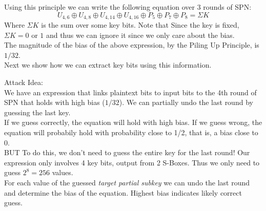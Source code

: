 \documentclass[9pt]{beamer}
\begin{document}
\begin{frame}
Using this principle we can write the following equation over 3 rounds of SPN:
\[ U_{4,6} \oplus U_{4,8} \oplus U_{4,14} \oplus U_{4, 16} \oplus P_5 \oplus P_7 \oplus P_8 = \Sigma K \]
Where $\Sigma K$ is the sum over some key bits. Note that Since the key is fixed, $\Sigma K = 0$ or $1$ and thus we can ignore it since we only care about the bias.\\
\vspace{5mm}
The magnitude of the bias of the above expression, by the Piling Up Principle, is $1/32$. \\
\vspace{5mm}
Next we show how we can extract key bits using this information.
\end{frame}

\begin{frame}
Attack Idea:\\
\vspace{3mm}
We have an expression that links plaintext bits to input bits to the 4th round of SPN that holds with high bias ($1/32$). We can partially undo the last round by guessing the last key. \\
\vspace{3mm}
\pause
If we guess correctly, the equation will hold with high bias. If we guess wrong, the equation will probabily hold with probability close to 1/2, that is, a bias close to 0.\\
\vspace{3mm}
\pause
BUT To do this, we don't need to guess the entire key for the last round! Our expression only involves 4 key bits, output from 2 S-Boxes. Thus we only need to guess $2^8 = 256$ values.\\
\vspace{3mm}
\pause
For each value of the guessed \textit{target partial subkey} we can undo the last round and determine the bias of the equation. Highest bias indicates likely correct guess.
\end{frame}
\end{document}
